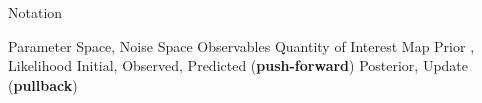 \begin{block}{Notation}
\centering
\large
    \begin{itemize}
        \itembox{$\lambda\in\pspace,\; \noise\in\nspace$} Parameter Space, Noise Space
        \itembox{$\data\in \dspace$} Observables
         Quantity of Interest Map
        \itembox{$  \prior ,\; \likelihood  $} Prior , Likelihood
        \itembox{$  \initial ,\; \observed ,\; \predicted $} Initial, Observed, Predicted (\textbf{push-forward})
        \itembox{$   \posterior,\; \updated  $} Posterior, Update (\textbf{pullback})
        
    \end{itemize}

\end{block}